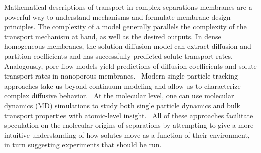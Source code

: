 \documentclass{article}
\begin{document}
  
  Mathematical descriptions of transport in complex separations membranes are a powerful 
  way to understand mechanisms and formulate membrane design principles. The complexity
  of a model generally parallels the complexity of the transport mechanism at hand, as
  well as the desired outputs. In dense homogeneous membranes, the solution-diffusion 
  model can extract diffusion and partition coefficients and has successfully predicted
  solute transport rates. Analogously, pore-flow models yield predictions of diffusion 
  coefficients and solute transport rates in nanoporous membranes.~\cite{wijmans_solution-diffusion_1995}
  Modern single particle tracking approaches take us beyond continuum modeling and 
  allow us to characterize complex diffusive behavior.~\cite{manzo_review_2015} 
  At the molecular level, one can use molecular dynamics (MD) simulations to study both
  single particle dynamics and bulk transport properties with atomic-level insight.~\cite{coscia_chemically_2019,maginn_best_2018}
  All of these approaches facilitate speculation on the molecular origins of separations
  by attempting to give a more intuitive understanding of how solutes move as a function
  of their environment, in turn suggesting experiments that should be run.
\end{document}
